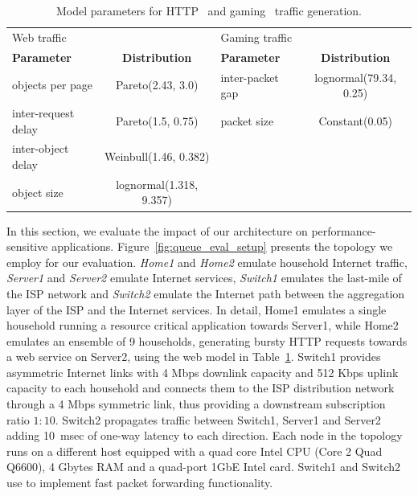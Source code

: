 \begin{table}
  \begin{tabular} {|l|c|l|c|}
    \hline
    Web traffic & & Gaming traffic & \\
    \textbf{Parameter} & \textbf{Distribution} & \textbf{Parameter} & \textbf{Distribution} \\
    \hline
    objects per page    & Pareto(2.43, 3.0)       & inter-packet gap & lognormal(79.34, 0.25)\\
    inter-request delay & Pareto(1.5, 0.75)       & packet size      & Constant(0.05) \\
    inter-object delay  & Weinbull(1.46, 0.382)   & &                 \\
    object size         & lognormal(1.318, 9.357) & &   \\
    \hline
  \end{tabular} 
  \caption{\label{t:homework:performance-web-model}Model parameters for HTTP~ and
    gaming~ traffic generation.}
\end{table}


In this section, we evaluate the impact of our architecture on
performance-sensitive applications.  Figure~\ref{fig:queue_eval_setup} presents
the topology we employ for our evaluation.  \textit{Home1} and \textit{Home2}
emulate household Internet traffic,  \textit{Server1} and \textit{Server2}
emulate Internet services,  \textit{Switch1} emulates the last-mile of the ISP
network and \textit{Switch2} emulate the Internet path between the aggregation
layer of the ISP and the Internet services. In detail, Home1 emulates a single
household running a resource critical application towards Server1, while Home2
emulates an ensemble of 9 households, generating bursty HTTP requests towards a
web service on Server2, using the web model in
Table~\ref{t:homework:performance-web-model}.  Switch1 provides asymmetric
Internet links with 4 Mbps downlink capacity and  512 Kbps uplink capacity to
each household and  connects them to the ISP distribution network through a 4
Mbps symmetric link, thus providing a downstream subscription ratio $1:10$.
Switch2 propagates traffic between Switch1, Server1 and Server2 adding 10~msec
of one-way latency to each direction. Each node in the  topology runs on a
different host equipped with a quad core Intel CPU (Core 2 Quad Q6600), 4 Gbytes
RAM and a quad-port 1GbE Intel card. Switch1 and Switch2 use \ovs to implement
fast packet forwarding functionality.

